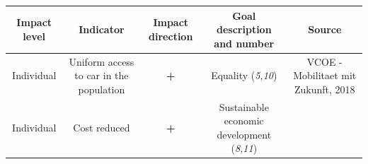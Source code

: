 \documentclass[
]{book}
\begin{document}
\begin{longtable}[]{@{}ccccc@{}}
\toprule
\begin{minipage}[b]{0.17\columnwidth}\centering
Impact level\strut
\end{minipage} & \begin{minipage}[b]{0.16\columnwidth}\centering
Indicator\strut
\end{minipage} & \begin{minipage}[b]{0.17\columnwidth}\centering
Impact direction\strut
\end{minipage} & \begin{minipage}[b]{0.17\columnwidth}\centering
Goal description and number\strut
\end{minipage} & \begin{minipage}[b]{0.17\columnwidth}\centering
Source\strut
\end{minipage}\tabularnewline
\midrule
\endhead
\begin{minipage}[t]{0.17\columnwidth}\centering
Individual\strut
\end{minipage} & \begin{minipage}[t]{0.16\columnwidth}\centering
Uniform access to car in the population\strut
\end{minipage} & \begin{minipage}[t]{0.17\columnwidth}\centering
\textbf{+}\strut
\end{minipage} & \begin{minipage}[t]{0.17\columnwidth}\centering
Equality (\emph{5,10})\strut
\end{minipage} & \begin{minipage}[t]{0.17\columnwidth}\centering
VCOE - Mobilitaet mit Zukunft, 2018\strut
\end{minipage}\tabularnewline
\begin{minipage}[t]{0.17\columnwidth}\centering
Individual\strut
\end{minipage} & \begin{minipage}[t]{0.16\columnwidth}\centering
Cost reduced\strut
\end{minipage} & \begin{minipage}[t]{0.17\columnwidth}\centering
\textbf{+}\strut
\end{minipage} & \begin{minipage}[t]{0.17\columnwidth}\centering
Sustainable economic development (\emph{8,11})\strut
\end{minipage} & \begin{minipage}[t]{0.17\columnwidth}\centering

\end{minipage}
\end{longtable}
\end{document}
